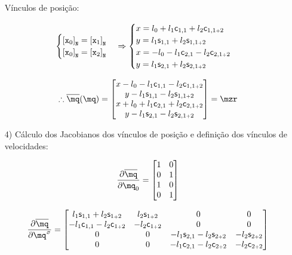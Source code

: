 \documentclass[a4paper,11pt,brazil,fleqn]{article}
\begin{document}
\begin{itemize}
V\'inculos de posi\c{c}\~ao:

\begin{equation}
\begin{cases}
\left[ \mathtt{x}_0 \right]_{\mathtt{N}} = \left[ \mathtt{x}_1 \right]_{\mathtt{N}} \\
\left[ \mathtt{x}_0 \right]_{\mathtt{N}} = \left[ \mathtt{x}_2 \right]_{\mathtt{N}} \\
\end{cases}
\Rightarrow
\begin{cases}
x = l_0 + l_1 \mathsf{c}_{1,1} + l_2 \mathsf{c}_{1,1{\scriptscriptstyle +} 2} \\
y = l_1 \mathsf{s}_{1,1} + l_2 \mathsf{s}_{1,1{\scriptscriptstyle +} 2} \\ 
x = -l_0 - l_1 \mathsf{c}_{2,1} - l_2 \mathsf{c}_{2,1{\scriptscriptstyle +} 2} \\
y = l_1 \mathsf{s}_{2,1} + l_2 \mathsf{s}_{2,1{\scriptscriptstyle +} 2} \\
\end{cases}
\end{equation}

\begin{equation}
\therefore \overline{\mq}(\mq) = 
\begin{bmatrix}
x - l_0 - l_1 \ccos_{1,1} - l_2 \ccos_{1,1\plus 2} \\
y - l_1 \ssin_{1,1} - l_2 \ssin_{1,1\plus 2} \\
x + l_0 + l_1 \ccos_{2,1} + l_2 \ccos_{2,1\plus 2} \\
y - l_1 \ssin_{2,1} - l_2 \ssin_{2,1\plus 2} \\
\end{bmatrix}
= \mzr
\end{equation}

\item[4)] C\'alculo dos Jacobianos dos v\'inculos de posi\c{c}\~ao e defini\c{c}\~ao dos v\'inculos de velocidades:

\begin{equation}
\frac{\partial \overline{\mq}}{\partial \mq_0} = 
\begin{bmatrix}
1 & 0 \\
0 & 1 \\
1 & 0 \\
0 & 1 \\
\end{bmatrix}
\end{equation}

\begin{equation}
\frac{\partial \overline{\mq}}{\partial \mq\hcir} = 
\begin{bmatrix}
 l_1 \ssin_{1,1} + l_2 \ssin_{1\plus 2} &  l_2 \ssin_{1\plus 2} & 0 & 0 \\
-l_1 \ccos_{1,1} - l_2 \ccos_{1\plus 2} & -l_2 \ccos_{1\plus 2} & 0 & 0  \\
0 & 0 & -l_1 \ssin_{2,1} - l_2 \ssin_{2\plus 2} & -l_2 \ssin_{2\plus 2}  \\
0 & 0 & -l_1 \ccos_{2,1} - l_2 \ccos_{2\plus 2} & -l_2 \ccos_{2\plus 2}   \\
\end{bmatrix}
\end{equation}


\end{itemize}
\end{document}
